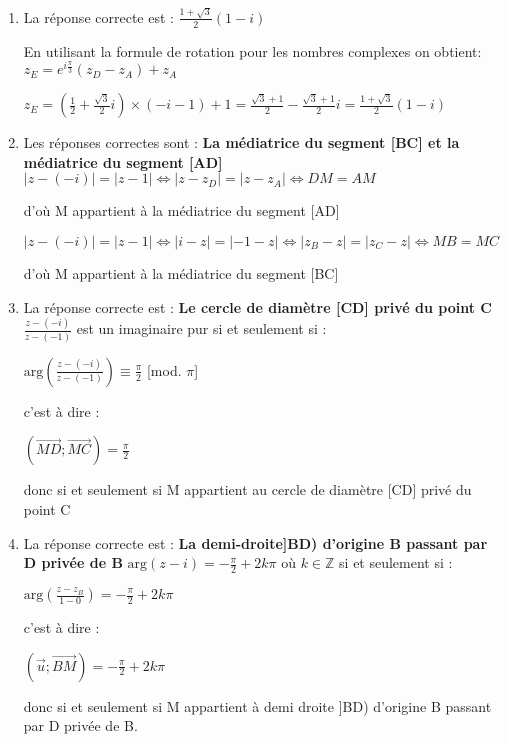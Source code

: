 \begin{corrige}
     \begin{enumerate}
          \item
          La réponse correcte est : $\frac{1+\sqrt{3}}{2}\left(1-i\right)$
          \par
          En utilisant la formule de rotation pour les nombres complexes on obtient: $z_{E}=e^{i\frac{\pi }{3}}\left(z_{D}-z_{A}\right)+z_{A}$
          \par
          $z_{E}=\left(\frac{1}{2}+\frac{\sqrt{3}}{2}i\right)\times \left(-i-1\right)+1=\frac{\sqrt{3}+1}{2}-\frac{\sqrt{3}+1}{2}i=\frac{1+\sqrt{3}}{2}\left(1-i\right)$
          \item
          Les réponses correctes sont : \textbf{La médiatrice du segment [BC] et la médiatrice du segment [AD]}
          $|z-\left(-i\right)|=|z-1|\Leftrightarrow |z-z_{D}|=|z-z_{A}|\Leftrightarrow DM=AM$
          \par
          d'où M appartient à la médiatrice du segment [AD]
          \par
          $|z-\left(-i\right)|=|z-1|\Leftrightarrow |i-z|=|-1-z|\Leftrightarrow |z_{B}-z|=|z_{C}-z|\Leftrightarrow MB=MC$
          \par
          d'où M appartient à la médiatrice du segment [BC]
          \item
          La réponse correcte est : \textbf{Le cercle de diamètre [CD] privé du point C}
          $\frac{z-\left(-i\right)}{z-\left(-1\right)}$ est un imaginaire pur si et seulement si :
          \par
          $\text{arg}\left(\frac{z-\left(-i\right)}{z-\left(-1\right)}\right)\equiv \frac{\pi }{2}$ [mod. $\pi $]
          \par
          c'est à dire :
          \par
          $\left(\overrightarrow{MD};\overrightarrow{MC}\right)=\frac{\pi }{2}$
          \par
          donc si et seulement si M appartient au cercle de diamètre [CD] privé du point C
          \item
          La réponse correcte est : \textbf{La demi-droite]BD) d'origine B passant par D privée de B}
          $\text{arg}\left(z-i\right)=-\frac{\pi }{2}+2k\pi $ où $k\in \mathbb{Z}$ si et seulement si :
          \par
          $\text{arg}\left(\frac{z-z_{B}}{1-0}\right)=-\frac{\pi }{2}+2k\pi $
          \par
          c'est à dire :
          \par
          $\left(\vec{u};\overrightarrow{BM}\right)=-\frac{\pi }{2}+2k\pi $
          \par
          donc si et seulement si M appartient à demi droite ]BD) d'origine B passant par D privée de B.
     \end{enumerate}
\end{corrige}
